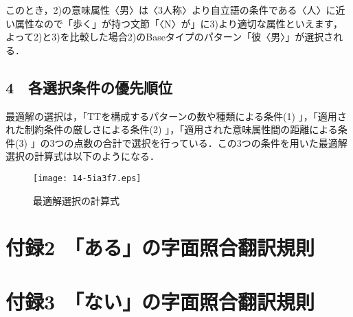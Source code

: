 \documentclass[japanese]{jnlp_1.4}
\begin{document}
このとき，2)の意味属性〈男〉は〈3人称〉より自立語の条件である〈人〉に近い属性なので「歩く」が持つ文節「〈N〉が」に3)より適切な属性といえます，よって2)と3)を比較した場合2)のBaseタイプのパターン「彼〈男〉」が選択される．



\subsection*{4　各選択条件の優先順位}

最適解の選択は，「TTを構成するパターンの数や種類による条件(1) 」，「適用された制約条件の厳しさによる条件(2) 」，「適用された意味属性間の距離による条件(3) 」の3つの点数の合計で選択を行っている．この3つの条件を用いた最適解選択の計算式は以下のようになる．

\begin{figure}[h]
\begin{center}
\texttt{[image: 14-5ia3f7.eps]}
\end{center}
 \caption{最適解選択の計算式}
\end{figure}







\clearpage
\section*{付録2　「ある」の字面照合翻訳規則}







\clearpage
\section*{付録3　「ない」の字面照合翻訳規則}



\begin{biography}



\end{biography}


\biodate
\end{document}
